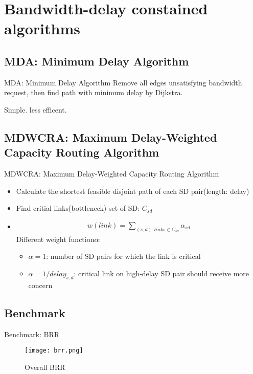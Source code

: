 \documentclass{beamer}
\begin{document}
\section{Bandwidth-delay constained algorithms}
\subsection{MDA: Minimum Delay Algorithm}

\begin{frame}{MDA: Minimum Delay Algorithm}
Remove all edges unsatisfying bandwidth request, then find path with minimum delay by Dijkstra.

Simple. less efficent.
    
\end{frame}

\subsection{MDWCRA: Maximum Delay-Weighted Capacity Routing Algorithm}
\begin{frame}{MDWCRA: Maximum Delay-Weighted Capacity Routing Algorithm}
    \begin{itemize}
        \item Calculate the shortest feasible disjoint path of each SD pair(length: delay)
        \item Find critial links(bottleneck) set of SD: $C_{sd}$
        \item \begin{eqnarray}
            w(link) = \sum_{(s, d): links \in C_{sd}} {\alpha_{sd}}
        \end{eqnarray}
        Different weight function$\alpha$:
            \begin{itemize}
                \item $\alpha = 1$: number of SD pairs for which the link is critical
                \item $\alpha = 1 / delay_{s, d}$: critical link on high-delay SD pair should receive more concern
            \end{itemize}
    \end{itemize}
\end{frame}

\subsection{Benchmark}

\begin{frame}{Benchmark: BRR}
\begin{figure}
    \texttt{[image: brr.png]}
    \caption{Overall BRR}
\end{figure}
    
\end{frame}
\end{document}
